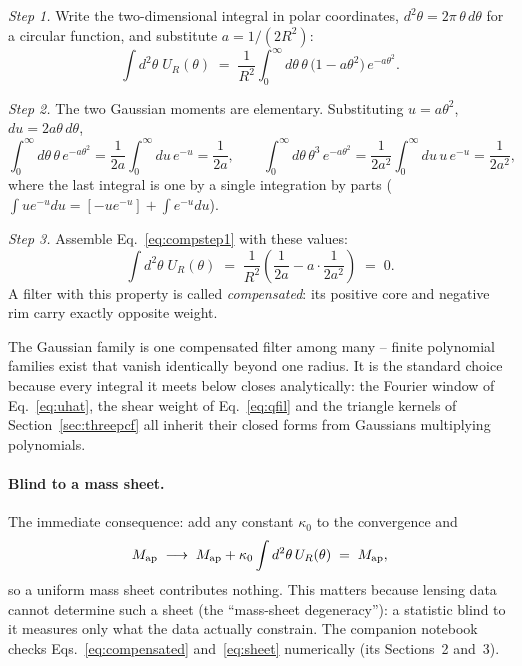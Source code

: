 \documentclass[11pt]{article}
\newcommand{\Map}{M_{\rm ap}}
\newcommand{\Ufil}{U_R}
\numberwithin{equation}{section}
\begin{document}
\emph{Step 1.}  Write the two-dimensional integral in polar
coordinates, $d^2\theta = 2\pi\,\theta\,d\theta$ for a circular
function, and substitute $a = 1/(2R^2)$:
\begin{equation}
  \int d^2\theta\; \Ufil(\theta)
  \;=\; \frac{1}{R^2}\int_0^\infty d\theta\,\theta\,
  \bigl(1 - a\theta^2\bigr)\, e^{-a\theta^2} .
  \label{eq:compstep1}
\end{equation}

\emph{Step 2.}  The two Gaussian moments are elementary.
Substituting $u = a\theta^2$, $du = 2a\theta\,d\theta$,
\begin{equation}
  \int_0^\infty d\theta\,\theta\, e^{-a\theta^2}
  = \frac{1}{2a}\int_0^\infty du\, e^{-u}
  = \frac{1}{2a},
  \qquad
  \int_0^\infty d\theta\,\theta^3\, e^{-a\theta^2}
  = \frac{1}{2a^2}\int_0^\infty du\, u\, e^{-u}
  = \frac{1}{2a^2},
  \label{eq:gaussmoments}
\end{equation}
where the last integral is one by a single integration by parts
($\int u e^{-u} du = [-u e^{-u}] + \int e^{-u} du$).

\emph{Step 3.}  Assemble Eq.~\eqref{eq:compstep1} with these values:
\begin{equation}
  \int d^2\theta\; \Ufil(\theta)
  \;=\; \frac{1}{R^2}
  \left(\frac{1}{2a} - a\cdot\frac{1}{2a^2}\right)
  \;=\; 0 .
  \label{eq:compensated}
\end{equation}
A filter with this property is called \emph{compensated}: its
positive core and negative rim carry exactly opposite weight.

The Gaussian family is one compensated filter among many -- finite
polynomial families exist that vanish identically beyond one
radius.  It is the standard choice because every integral it meets
below closes analytically: the Fourier window of
Eq.~\eqref{eq:uhat}, the shear weight of Eq.~\eqref{eq:qfil} and
the triangle kernels of Section~\ref{sec:threepcf} all inherit
their closed forms from Gaussians multiplying polynomials.

\paragraph{Blind to a mass sheet.}
The immediate consequence: add any constant $\kappa_0$ to the
convergence and
\begin{equation}
  \Map \;\longrightarrow\;
  \Map + \kappa_0 \int d^2\theta\, \Ufil(\theta)
  \;=\; \Map ,
  \label{eq:sheet}
\end{equation}
so a uniform mass sheet contributes nothing.  This matters because
lensing data cannot determine such a sheet (the ``mass-sheet
degeneracy''): a statistic blind to it measures only what the data
actually constrain.  The companion notebook checks
Eqs.~\eqref{eq:compensated} and~\eqref{eq:sheet} numerically (its
Sections~2 and~3).
\end{document}

